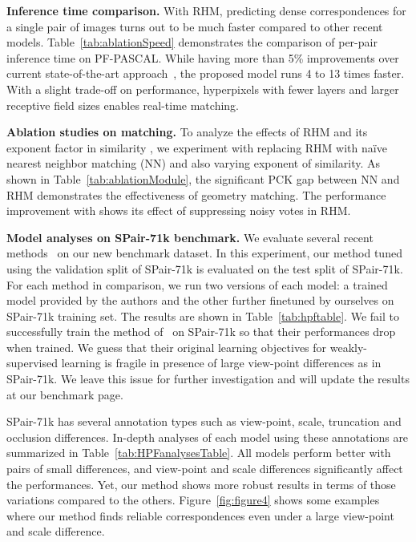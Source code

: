 \documentclass[10pt,twocolumn,letterpaper]{article}
\begin{document}
\smallbreak
\noindent \textbf{Inference time comparison.} With RHM, predicting dense correspondences for a single pair of images turns out to be much faster compared to other recent models. Table~\ref{tab:ablationSpeed} demonstrates the comparison of per-pair inference time on PF-PASCAL. While having more than 5\% improvements over current state-of-the-art approach~\cite{rocco2018neighbourhood}, the proposed model runs 4 to 13 times faster. With a slight trade-off on performance, hyperpixels with fewer layers and larger receptive field sizes enables real-time matching.

\smallbreak
\noindent \textbf{Ablation studies on matching.} 
To analyze the effects of RHM and its exponent factor  in similarity , we experiment with replacing RHM with na\"ive nearest neighbor matching (NN) and also varying exponent  of similarity. As shown in Table~\ref{tab:ablationModule}, the significant PCK gap between NN and RHM demonstrates the effectiveness of geometry matching. The performance improvement with  shows its effect of suppressing noisy votes in RHM.


\smallbreak
\noindent \textbf{Model analyses on SPair-71k benchmark.} We evaluate several recent methods~\cite{Rocco17, Rocco18, rocco2018neighbourhood, paul2018attentive} on our new benchmark dataset. In this experiment, our method tuned using the validation split of SPair-71k is evaluated on the test split of SPair-71k. For each method in comparison, we run two versions of each model: a trained model provided by the authors and the other further finetuned by ourselves on SPair-71k training set. The results are shown in Table~\ref{tab:hpftable}. We fail to successfully train the method of~\cite{Rocco18,rocco2018neighbourhood} on SPair-71k so that their performances drop when trained. We guess that their original learning objectives for weakly-supervised learning is fragile in presence of large view-point differences as in SPair-71k. We leave this issue for further investigation and will update the results at our benchmark page. 



SPair-71k has several annotation types such as view-point, scale, truncation and occlusion differences. In-depth analyses of each model using these annotations are summarized in Table~\ref{tab:HPFanalysesTable}. All models perform better with pairs of small differences, and view-point and scale differences significantly affect the performances. Yet, our method shows more robust results in terms of those variations compared to the others.
Figure~\ref{fig:figure4} shows some examples where our method finds reliable correspondences even under a large view-point and scale difference.
\end{document}
